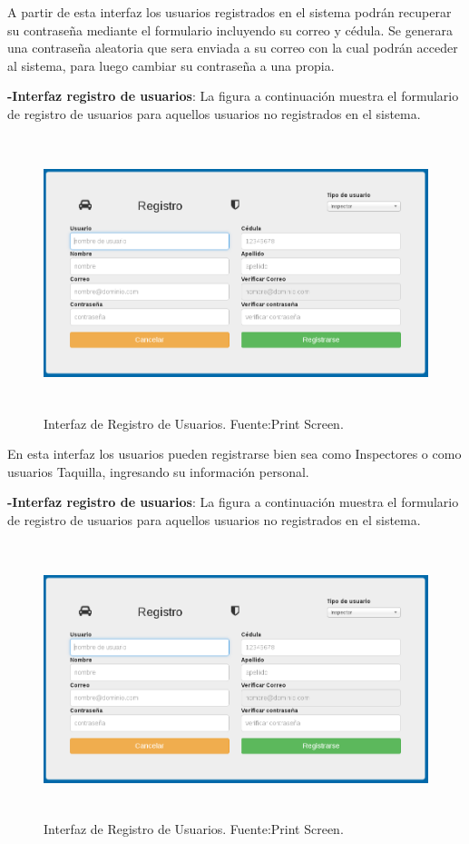 A partir de esta interfaz los usuarios registrados en el sistema podrán recuperar su contraseña mediante el formulario incluyendo su correo y cédula. Se generara una contraseña aleatoria que sera enviada a su correo con la cual podrán acceder al sistema, para luego cambiar su contraseña a una propia.


\textbf{-Interfaz registro de usuarios}: La figura a continuación muestra el formulario de registro de usuarios para aquellos usuarios no registrados en el sistema.

\begin{figure}[H]
\begin{center}
	\includegraphics[width=14cm,height=8cm]{img/interfaces/registro_usuario.png}
\end{center}
\caption{Interfaz de Registro de Usuarios. Fuente:Print Screen.}
\label{fig:interfaz_registro_usuario}
\end{figure}

En esta interfaz los usuarios pueden registrarse bien sea como Inspectores o como usuarios Taquilla, ingresando su información personal.


\textbf{-Interfaz registro de usuarios}: La figura a continuación muestra el formulario de registro de usuarios para aquellos usuarios no registrados en el sistema.

\begin{figure}[H]
\begin{center}
	\includegraphics[width=14cm,height=8cm]{img/interfaces/registro_usuario.png}
\end{center}
\caption{Interfaz de Registro de Usuarios. Fuente:Print Screen.}
\label{fig:interfaz_registro_usuario}
\end{figure}

